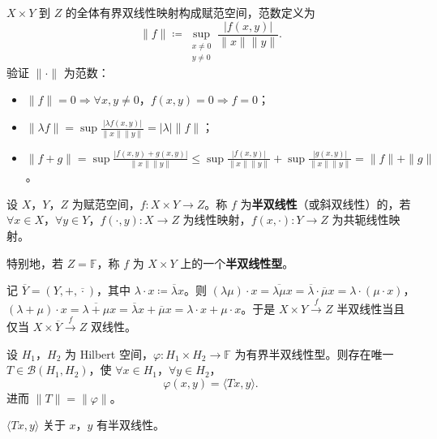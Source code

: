 \documentclass[lang=cn,a4paper,newtx,section]{elegantbook}
\begin{document}
$X\times Y$ 到 $Z$ 的全体有界双线性映射构成赋范空间，范数定义为
\[
  \|f\|\coloneqq\sup_{\substack{x\neq 0\\y\neq 0}}\frac{|f(x,y)|}{\|x\|\|y\|}.
\]
验证 $\|\cdot\|$ 为范数：
\begin{itemize}
  \item $\|f\|=0\Rightarrow\forall x,y\neq 0$，$f(x,y)=0\Rightarrow f=0$；
  \item $\|\lambda f\|=\sup\frac{|\lambda f(x,y)|}{\|x\|\|y\|}=|\lambda|\|f\|$；
  \item $\|f+g\|=\sup\frac{|f(x,y)+g(x,y)|}{\|x\|\|y\|}\leq\sup\frac{|f(x,y)|}{\|x\|\|y\|}+\sup\frac{|g(x,y)|}{\|x\|\|y\|}=\|f\|+\|g\|$。
\end{itemize}

\begin{definition}[半双线性映射]
  设 $X$，$Y$，$Z$ 为赋范空间，$f:X\times Y\to Z$。称 $f$ 为\textbf{半双线性}（或斜双线性）的，若 $\forall x\in X$，$\forall y\in Y$，$f(\cdot,y):X\to Z$ 为线性映射，$f(x,\cdot):Y\to Z$ 为共轭线性映射。

  特别地，若 $Z=\mathbb{F}$，称 $f$ 为 $X\times Y$ 上的一个\textbf{半双线性型}。
\end{definition}

\begin{remark}
  记 $\overline{Y}=(Y,+,\overline{\cdot})$，其中 $\lambda\cdot x\coloneqq\overline{\lambda}x$。则 $(\lambda\mu)\cdot x=\overline{\lambda\mu}x=\overline{\lambda}\cdot\overline{\mu}x=\lambda\cdot(\mu\cdot x)$，$(\lambda+\mu)\cdot x=\overline{\lambda+\mu}x=\overline{\lambda}x+\overline{\mu}x=\lambda\cdot x+\mu\cdot x$。于是 $X\times Y\xrightarrow{f}Z$ 半双线性当且仅当 $X\times\overline{Y}\xrightarrow{f}Z$ 双线性。
\end{remark}

\begin{theorem}\label{thm:sesquilinear-riesz}
  设 $H_1$，$H_2$ 为 Hilbert 空间，$\varphi:H_1\times H_2\to\mathbb{F}$ 为有界半双线性型。则存在唯一 $T\in\mathcal{B}(H_1,H_2)$，使 $\forall x\in H_1$，$\forall y\in H_2$，
  \[
    \varphi(x,y)=\langle Tx,y\rangle.
  \]
  进而 $\|T\|=\|\varphi\|$。
\end{theorem}

\begin{remark}
  $\langle Tx,y\rangle$ 关于 $x$，$y$ 有半双线性。
\end{remark}
\end{document}
